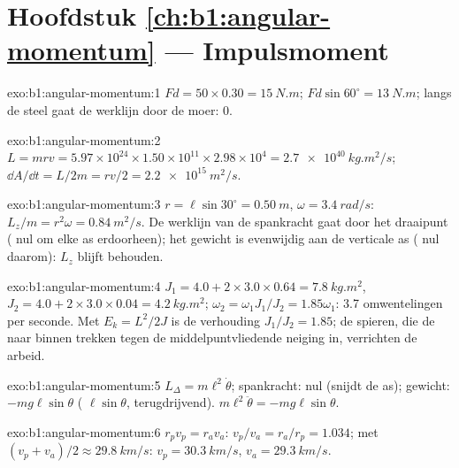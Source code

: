 \section*{Hoofdstuk \ref{ch:b1:angular-momentum} --- Impulsmoment}

\begin{solution}{exo:b1:angular-momentum:1}
$Fd = 50 \times 0.30 = \qty{15}{N.m}$; $Fd\sin 60^\circ = \qty{13}{N.m}$;
langs de steel gaat de werklijn door de moer: $0$.
\end{solution}

\begin{solution}{exo:b1:angular-momentum:2}
$L = mrv = 5.97\times10^{24} \times 1.50\times10^{11} \times 2.98\times10^4 =
\qty{2.7e40}{kg.m^2/s}$; $\dd A/\dd t = L/2m = rv/2 = \qty{2.2e15}{m^2/s}$.
\end{solution}

\begin{solution}{exo:b1:angular-momentum:3}
$r = \ell\sin 30^\circ = \qty{0.50}{m}$, $\omega = \qty{3.4}{rad/s}$:
$L_z/m = r^2\omega = \qty{0.84}{m^2/s}$. De werklijn van de spankracht
gaat door het draaipunt ( nul om elke as erdoorheen); het
gewicht is evenwijdig aan de verticale as ( nul daarom): $L_z$
blijft behouden.
\end{solution}

\begin{solution}{exo:b1:angular-momentum:4}
$J_1 = 4.0 + 2 \times 3.0 \times 0.64 = \qty{7.8}{kg.m^2}$, $J_2 = 4.0 +
2 \times 3.0 \times 0.04 = \qty{4.2}{kg.m^2}$; $\omega_2 = \omega_1J_1/J_2 =
1.85\omega_1$: \qty{3.7}{} omwentelingen per seconde. Met $E_k = L^2/2J$ is de verhouding
$J_1/J_2 = 1.85$; de spieren, die de  naar binnen trekken tegen de
middelpuntvliedende neiging in, verrichten de arbeid.
\end{solution}

\begin{solution}{exo:b1:angular-momentum:5}
$L_\Delta = m\ell^2\dot\theta$; spankracht:  nul (snijdt de as);
gewicht: $-mg\ell\sin\theta$ ( $\ell\sin\theta$, terugdrijvend).
$m\ell^2\ddot\theta = -mg\ell\sin\theta$.
\end{solution}

\begin{solution}{exo:b1:angular-momentum:6}
$r_pv_p = r_av_a$: $v_p/v_a = r_a/r_p = 1.034$; met $(v_p + v_a)/2 \approx
\qty{29.8}{km/s}$: $v_p = \qty{30.3}{km/s}$, $v_a = \qty{29.3}{km/s}$.
\end{solution}

